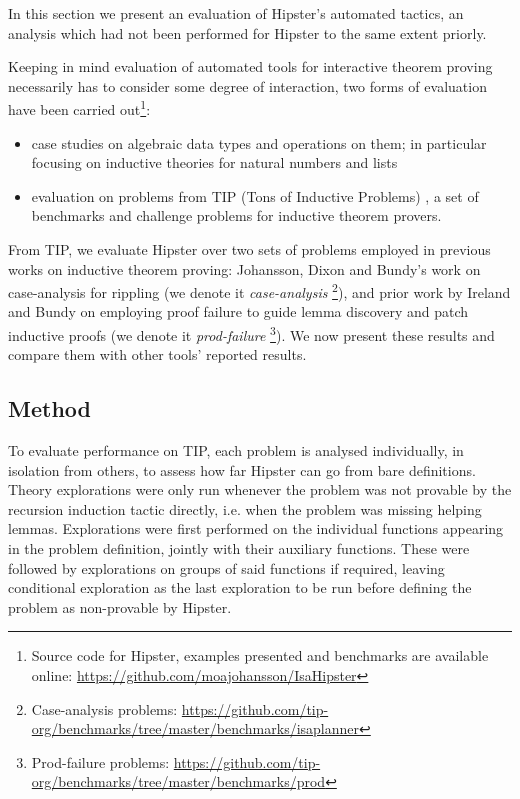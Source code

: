 \label{sec:evaluation}

In this section we present an evaluation of Hipster's automated tactics, an analysis which had not been performed for Hipster to the same extent priorly.

Keeping in mind evaluation of automated tools for interactive theorem proving necessarily has to consider some degree of interaction, two forms of evaluation have been carried out\footnote{Source code for Hipster, examples presented and benchmarks are available online: \url{https://github.com/moajohansson/IsaHipster}}:

\begin{itemize}
\item case studies on algebraic data types and operations on them; in particular focusing on inductive theories for natural numbers and lists

\item evaluation on problems from TIP (Tons of Inductive Problems) \cite{tip-benchmarks}, a set of benchmarks and challenge problems for inductive theorem provers.
\end{itemize}

From TIP, we evaluate Hipster over two sets of problems employed in previous works on inductive theorem proving: Johansson, Dixon and Bundy's work on case-analysis for rippling \cite{IsaPcase} (we denote it \emph{case-analysis} \footnote{Case-analysis problems: \url{https://github.com/tip-org/benchmarks/tree/master/benchmarks/isaplanner}}), and prior work by Ireland and Bundy on employing proof failure to guide lemma discovery and patch inductive proofs \cite{productiveuse} (we denote it \emph{prod-failure} \footnote{Prod-failure problems: \url{https://github.com/tip-org/benchmarks/tree/master/benchmarks/prod}}).
%
We now present these results and compare them with other tools' reported results.


\subsection{Method}

To evaluate performance on TIP, each problem is analysed individually, in isolation from others, to assess how far Hipster can go from bare definitions.
%
Theory explorations were only run whenever the problem was not provable by the recursion induction tactic directly, i.e. when the problem was missing helping lemmas.
%
Explorations were first performed on the individual functions appearing in the problem definition, jointly with their auxiliary functions.
%
These were followed by explorations on groups of said functions if required, leaving conditional exploration as the last exploration to be run before defining the problem as non-provable by Hipster.

